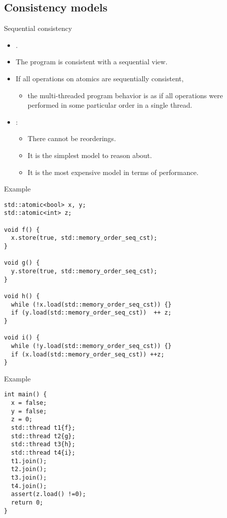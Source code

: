 \subsection{Consistency models}

\begin{frame}[t]{Sequential consistency}
\begin{itemize}
  \item {}.
  \item The program is consistent with a sequential view.
  \item If all operations on atomics are sequentially consistent,
    \begin{itemize}
      \item the multi-threaded program behavior is as if all operations
            were performed in some particular order in a single thread.
    \end{itemize}
  \item {}:
    \begin{itemize}
      \item There cannot be reorderings.
      \item It is the simplest model to reason about.
      \item It is the most expensive model in terms of performance.
    \end{itemize}
\end{itemize}
\end{frame}

\begin{frame}[t,fragile]{Example}
\begin{lstlisting}
std::atomic<bool> x, y;
std::atomic<int> z;

void f() {
  x.store(true, std::memory_order_seq_cst);
}

void g() {
  y.store(true, std::memory_order_seq_cst);
}

void h() {
  while (!x.load(std::memory_order_seq_cst)) {}
  if (y.load(std::memory_order_seq_cst))  ++ z;
}

void i() {
  while (!y.load(std::memory_order_seq_cst)) {}
  if (x.load(std::memory_order_seq_cst)) ++z;
}
\end{lstlisting}
\end{frame}

\begin{frame}[t,fragile]{Example}
\begin{lstlisting}
int main() {
  x = false;
  y = false;
  z = 0;
  std::thread t1{f};
  std::thread t2{g};
  std::thread t3{h};
  std::thread t4{i};
  t1.join();
  t2.join();
  t3.join();
  t4.join();
  assert(z.load() !=0);
  return 0;
}
\end{lstlisting}
\end{frame}


